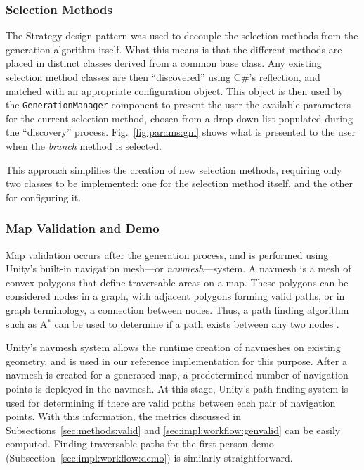 \documentclass[journal]{IEEEtran}
\begin{document}
\subsubsection{Selection Methods}
\label{sec:impl:details:gm}

The Strategy design pattern \cite{nystrom2014game} was used to decouple the selection
methods from the generation algorithm itself. What this means is that the different
methods are placed in distinct classes derived from a common base class. Any existing
selection method classes are then ``discovered'' using C\#'s reflection,
and matched with an appropriate configuration object. This object is then used by the
\texttt{GenerationManager} component to present the user the available parameters for
the current selection method, chosen from a drop-down list populated during the
``discovery'' process. Fig.~\ref{fig:params:gm} shows what is presented to the user
when the \textit{branch} method is selected.

This approach simplifies the creation of new selection methods, requiring only two
classes to be implemented: one for the selection method itself, and the other for
configuring it.

\subsubsection{Map Validation and Demo}
\label{sec:impl:details:validation}

Map validation occurs after the generation process, and is performed using Unity's
built-in navigation mesh---or \textit{navmesh}---system. A navmesh is a mesh of convex
polygons that define traversable areas on a map. These polygons can be considered
nodes in a graph, with adjacent polygons forming valid paths, or in graph terminology,
a connection between nodes. Thus, a path finding algorithm such as A$^*$ can be used
to determine if a path exists between any two nodes \cite{millington2019ai}.

Unity's navmesh system allows the runtime creation of navmeshes on existing geometry,
and is used in our reference implementation for this purpose. After a navmesh is
created for a generated map, a predetermined number of navigation points is deployed
in the navmesh. At this stage, Unity's path finding system is used for determining if
there are valid paths between each pair of navigation points. With this information,
the metrics discussed in Subsections~\ref{sec:methods:valid} and
\ref{sec:impl:workflow:genvalid} can be easily computed. Finding traversable paths
for the first-person demo (Subsection~\ref{sec:impl:workflow:demo}) is similarly
straightforward.
\end{document}
